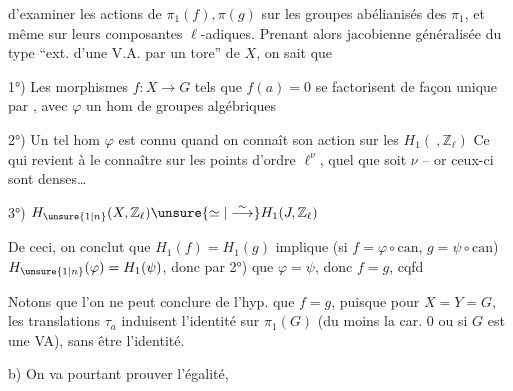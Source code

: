 d'examiner les actions de $\pi_1(f),\pi(g)$ sur les groupes abélianisés des $\pi_1$, et même sur leurs composantes $\ell$-adiques. Prenant alors jacobienne généralisée du type ``ext. d'une V.A. par un tore'' de $X$, on sait que

1°) Les morphismes $f:X\longrightarrow G$ tels que $f(a)=0$ se factorisent de façon unique par
,
avec $\varphi$ un hom de groupes algébriques

2°)  Un tel hom $\varphi$ est connu quand on connaît son action sur les $H_1(\ ,\mathbb Z_\ell)$ Ce qui revient à le connaître sur les points d'ordre $\ell^\nu$, quel que soit $\nu$ -- or ceux-ci sont denses\ldots

3°) $H_{\unsure{1|n}}(X,\mathbb Z_\ell)\unsure{\simeq|\overset{\sim}{\longrightarrow}}H_1(J,\mathbb Z_\ell)$

De ceci,  on conclut  que $H_1(f)=H_1(g)$ implique (si $f=\varphi\circ\mathrm{can}$, $g=\psi\circ\mathrm{can}$) $H_{\unsure{1|n}}(\varphi)=H_1(\psi)$, donc par 2°) que $\varphi=\psi$, donc $f=g$, cqfd

 Notons que l'on ne peut conclure de l'hyp.  que $f=g$, puisque pour $X=Y=G$, les translations $\tau_a$ induisent l'identité sur $\pi_1(G)$ (du moins  la car. $0$ ou si $G$ est une VA), sans être l'identité.

b) On va pourtant prouver l'égalité,
